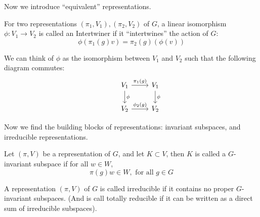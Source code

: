 Now we introduce ``equivalent'' representations.
\begin{definition}[Intertwiner]
    For two representations $(\pi_1, V_1), (\pi_2, V_2)$ of $G$, a linear isomorphism $\phi: V_1\to V_2$ is called an Intertwiner if it ``intertwines'' the action of $G$:
    \begin{equation*}
            \phi(\pi_1(g)v)=\pi_2(g)(\phi(v))
    \end{equation*}
\end{definition}
\begin{remark}
    We can think of $\phi$ as the isomorphism between $V_1$ and $V_2$ such that the following diagram commutes:
    \begin{equation*}
        \begin{tikzcd}
            & V_1 \arrow{d}{\phi} \arrow{r}{\pi_1(g)} & V_1 \arrow{d}{\phi}\\
            & V_2 \arrow{r}{\phi_2(g)} & V_2
        \end{tikzcd}
    \end{equation*}
\end{remark}

Now we find the building blocks of representations: invariant subspaces, and irreducible representations.
\begin{definition}
    Let $(\pi, V)$ be a representation of $G$, and let $K\subset V$, then $K$ is called a $G$-invariant subspace if for all $w\in W$,
    \begin{equation*}
        \pi(g)w\in W, \text{ for all }g\in G
    \end{equation*}
\end{definition}
\begin{definition}
    A representation $(\pi, V)$ of $G$ is called irreducible if it contains no proper $G$-invariant subspaces. (And is call totally reducible if it can be written as a direct sum of irreducible subspaces).
\end{definition}

